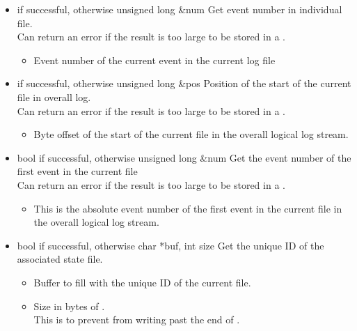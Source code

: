 \begin{itemize}
\begin{itemize}
\item {}
  {} { if successful,  otherwise}
  {unsigned long \&num}
  {Get event number in individual file.
    \\ \Note Can return an error if the result is too large to be
    stored in a .}
  \begin{itemize}
  \item {}
    Event number of the current event in the current log file
  \end{itemize}

\item {}
  {} { if successful,  otherwise}
  {unsigned long \&pos}
  {Position of the start of the current file in overall log.
    \\ \Note Can return an error if the result is too large
    to be stored in a .}
  \begin{itemize}
  \item {}
    Byte offset of the start of the current file in the overall
    logical log stream.
  \end{itemize}

\item {}
  {bool} { if successful,  otherwise}
  {unsigned long \&num}
  {Get the event number of the first event in the current file
    \\ \Note Can return an error if the result is too large
    to be stored in a .}
  \begin{itemize}
  \item {}
    This is the absolute event number of the first event in the
    current file in the overall logical log stream.
  \end{itemize}

\item {}
  {bool} { if successful,  otherwise}
  {char *buf, int size}
  {Get the unique ID of the associated state file.}
  \begin{itemize}
  \item {}
    Buffer to fill with the unique ID of the current file.
  \item {}
    Size in bytes of .
    \\ This is to prevent 
    from writing past the end of .
  \end{itemize}


\end{itemize}
\end{itemize}
